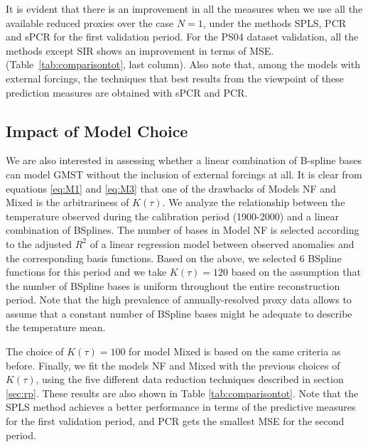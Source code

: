 \documentclass[12pt]{amsart}
\theoremstyle{plain}
\theoremstyle{definition}
\theoremstyle{remark}
\newcommand{\lb}[1]{\color{MidnightBlue}\textbf{[LB: #1]}\normalcolor}
\newcommand{\jeg}[1]{\color{ProcessBlue}\textbf{[JEG: #1]}\normalcolor}
\begin{document}
It is evident that there is an improvement in all the measures when we use all the available reduced proxies over the case
$N=1$, under the methods SPLS, PCR and sPCR for the first validation period.
For the PS04 dataset validation, all the methods except SIR shows an improvement in terms of MSE. (Table~\ref{tab:comparisontot}, last column). Also note that, among the models with external forcings, the techniques that best results from the viewpoint of these prediction measures are obtained with sPCR and PCR.

\subsection{Impact of Model Choice}
We are also interested in assessing whether a linear combination of B-spline bases can model GMST without the inclusion of external
forcings at all. It is clear from equations \eqref{eq:M1} and \eqref{eq:M3} that
one of the drawbacks of Models NF and Mixed is the arbitrariness of $K(\tau)$. We analyze the
relationship between the temperature observed during the calibration period
(1900-2000) and a linear combination of BSplines. The number of 
bases in Model NF is selected according to the adjusted $R^2$ of a linear regression model between observed anomalies and
the corresponding basis functions. Based on the above, we selected 6
BSpline functions for this period and we take $K(\tau)=120$ based on the
assumption that the number of BSpline bases is uniform
throughout the entire reconstruction period. Note that the high prevalence of
annually-resolved proxy data allows to assume that a constant number of BSpline bases might be adequate to describe the temperature
mean.%
  
  The choice of $K(\tau)=100$ for model Mixed is
based on the same criteria as before. Finally, we fit the models NF and Mixed
with the previous choices of $K(\tau)$, using the five different data reduction
techniques described in section \ref{sec:rp}. These results are
also shown in Table \ref{tab:comparisontot}. Note that the SPLS method achieves a better performance in terms of the
predictive measures for the first validation period, and PCR gets the smallest
MSE for the second period. 
\end{document}
